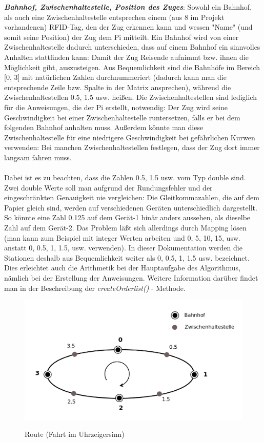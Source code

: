 \textit{\textbf{Bahnhof, Zwischenhaltestelle, Position des Zuges}}: Sowohl ein Bahnhof, als auch eine Zwischenhaltestelle entsprechen einem (aus 8 im Projekt vorhandenen) RFID-Tag, den der Zug erkennen kann und wessen "Name" (und somit seine Position) der Zug dem Pi mitteilt. Ein Bahnhof wird von einer Zwischenhaltestelle dadurch unterschieden, dass auf einem Bahnhof ein sinnvolles Anhalten stattfinden kann: Damit der Zug Reisende aufnimmt bzw. ihnen die Möglichkeit gibt, auszusteigen. Aus Bequemlichkeit sind die Bahnhöfe im Bereich [0, 3] mit natürlichen Zahlen durchnummeriert (dadurch kann man die entsprechende Zeile bzw. Spalte in der Matrix ansprechen), während die Zwischenhaltestellen 0.5, 1.5 usw. heißen. Die Zwischenhaltestellen sind lediglich für die Anweisungen, die der Pi erstellt, notwendig: Der Zug wird seine Geschwindigkeit bei einer Zwischenhaltestelle runtersetzen, falls er bei dem folgenden Bahnhof anhalten muss. Außerdem könnte man diese Zwischenhaltestelle für eine niedrigere Geschwindigkeit bei gefährlichen Kurwen verwenden: Bei manchen Zwischenhaltestellen festlegen, dass der Zug dort immer langsam fahren muss.\\
\\
Dabei ist es zu beachten, dass die Zahlen 0.5, 1.5 usw. vom Typ double sind. Zwei double Werte soll man aufgrund der Rundungsfehler und der eingeschränkten Genauigkeit nie vergleichen: Die Gleitkommazahlen, die auf dem Papier gleich sind, werden auf verschiedenen Geräten unterschiedlich dargestellt. So könnte eine Zahl 0.125 auf dem Gerät-1 binär anders aussehen, als dieselbe Zahl auf dem Gerät-2. Das Problem läßt sich allerdings durch Mapping lösen (man kann zum Beispiel mit integer Werten arbeiten und 0, 5, 10, 15, usw. anstatt 0, 0.5, 1, 1.5, usw. verwenden). In dieser Dokumentation werden die Stationen deshalb aus Bequemlichkeit weiter als 0, 0.5, 1, 1.5 usw. bezeichnet. Dies erleichtet auch die Arithmetik bei der Hauptaufgabe des Algorithmus, nämlich bei der Erstellung der Anweisungen. Weitere Information darüber findet man in der Beschreibung der \textit{createOrderlist()} - Methode.\\

\begin{figure}[H]	
\caption{Route (Fahrt im Uhrzeigersinn)}
\includegraphics[width=2\textwidth, width=470pt]{content/images/route.png}
\label{pic:route}
\end{figure}

